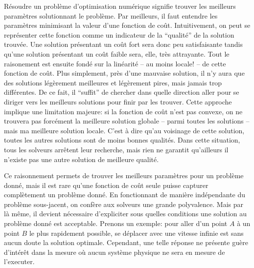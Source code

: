 Résoudre un problème d'optimisation numérique signifie trouver les
meilleurs paramètres solutionnant le problème. Par meilleurs, il faut
entendre les paramètres minimisant la valeur d'une fonction de
coût. Intuitivement, on peut se représenter cette fonction comme un
indicateur de la ``qualité'' de la solution trouvée. Une solution
présentant un coût fort sera donc peu satisfaisante tandis qu'une
solution présentant un coût faible sera, elle, très attrayante. Tout
le raisonement est ensuite fondé sur la linéarité -- au moins locale!
-- de cette fonction de coût. Plus simplement, près d'une mauvaise
solution, il n'y aura que des solutions légèrement meilleures et
légèrement pires, mais jamais trop différentes. De ce fait, il
``suffit'' de chercher dans quelle direction aller pour se diriger
vers les meilleurs solutions pour finir par les trouver. Cette
approche implique une limitation majeure: si la fonction de coût n'est
pas convexe, on ne trouvera pas forcément la meilleure solution
globale -- parmi toutes les solutions -- mais ma meilleure solution
locale. C'est à dire qu'au voisinage de cette solution, toutes les
autres solutions sont de moins bonnes qualités. Dans cette situation,
tous les solveurs arrêtent leur recherche, mais rien ne garantit
qu'ailleurs il n'existe pas une autre solution de meilleure qualité.


Ce raisonnement permets de trouver les meilleurs paramètres pour un
problème donné, mais il est rare qu'une fonction de coût seule puisse
capturer complètement un problème donné. En fonctionnant de manière
indépendante du problème sous-jacent, on confère aux solveurs une
grande polyvalence. Mais par là même, il devient nécessaire
d'expliciter sous quelles conditions une solution au problème donné
est acceptable. Prenons un exemple: pour aller d'un point $A$ à un
point $B$ le plus rapidement possible, se déplacer avec une vitesse
infinie est sans aucun doute la solution optimale. Cependant, une
telle réponse ne présente guère d'intérêt dans la mesure où aucun
système physique ne sera en mesure de l'executer.


